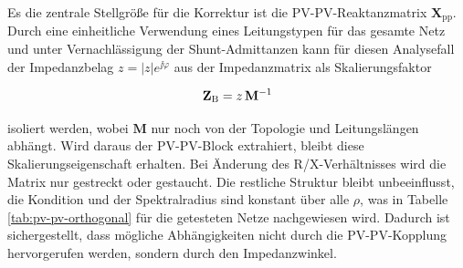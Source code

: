 Es die zentrale Stellgröße für die Korrektur ist die PV-PV-Reaktanzmatrix $\mathbf{X_\mathrm{pp}}$.
Durch eine einheitliche Verwendung eines Leitungstypen für das gesamte Netz und unter Vernachlässigung der Shunt-Admittanzen \cite{Salazar2024} kann für diesen Analysefall der Impedanzbelag $z=\lvert z\rvert e^{\jj\varphi}$ aus der Impedanzmatrix als Skalierungsfaktor 

\begin{equation}
\mathbf{Z}_\mathrm{B}=z\,\mathbf{M}^{-1}
\end{equation}

isoliert werden, wobei $\mathbf{M}$ nur noch von der Topologie und Leitungslängen abhängt.
Wird daraus der PV-PV-Block extrahiert, bleibt diese Skalierungseigenschaft erhalten.
Bei Änderung des R/X-Verhältnisses wird die Matrix nur gestreckt oder gestaucht.
Die restliche Struktur bleibt unbeeinflusst, die Kondition und der Spektralradius sind konstant über alle $\rho$, was in Tabelle \ref{tab:pv-pv-orthogonal} für die getesteten Netze nachgewiesen wird.
Dadurch ist sichergestellt, dass mögliche Abhängigkeiten nicht durch die PV-PV-Kopplung hervorgerufen werden, sondern durch den Impedanzwinkel.\\


